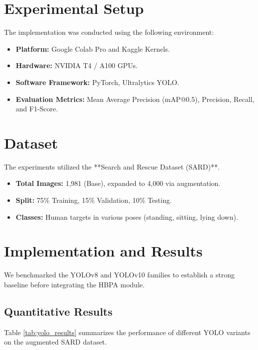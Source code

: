 \documentclass[12pt, a4paper]{report}
\begin{document}
\section{Experimental Setup}
The implementation was conducted using the following environment:
\begin{itemize}
    \item \textbf{Platform:} Google Colab Pro and Kaggle Kernels.
    \item \textbf{Hardware:} NVIDIA T4 / A100 GPUs.
    \item \textbf{Software Framework:} PyTorch, Ultralytics YOLO.
    \item \textbf{Evaluation Metrics:} Mean Average Precision (mAP@0.5), Precision, Recall, and F1-Score.
\end{itemize}

\section{Dataset}
The experiments utilized the **Search and Rescue Dataset (SARD)**.
\begin{itemize}
    \item \textbf{Total Images:} 1,981 (Base), expanded to 4,000 via augmentation.
    \item \textbf{Split:} 75\% Training, 15\% Validation, 10\% Testing.
    \item \textbf{Classes:} Human targets in various poses (standing, sitting, lying down).
\end{itemize}

\section{Implementation and Results}
We benchmarked the YOLOv8 and YOLOv10 families to establish a strong baseline before integrating the HBPA module.

\subsection{Quantitative Results}
Table \ref{tab:yolo_results} summarizes the performance of different YOLO variants on the augmented SARD dataset.
\end{document}

